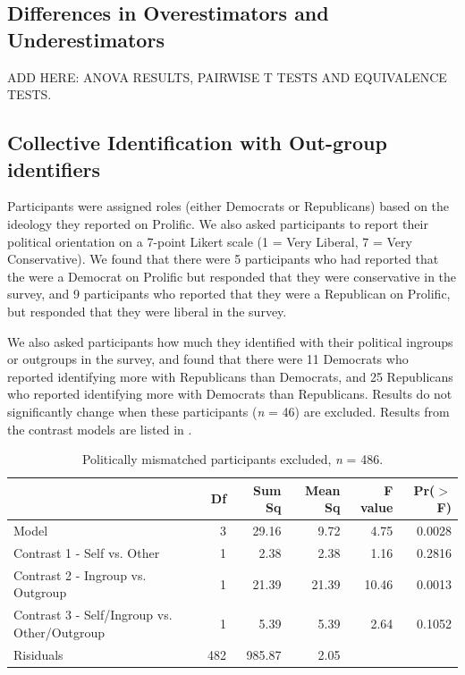 \documentclass[12pt,]{article}
\begin{document}
\clearpage
\subsection{Differences in Overestimators and Underestimators}
\label{appendix:over_under2}


ADD HERE: ANOVA RESULTS, PAIRWISE T TESTS AND EQUIVALENCE TESTS. 



\newpage
\subsection{Collective Identification with Out-group identifiers}
\label{appendix:mismatch}


Participants were assigned roles (either Democrats or Republicans) based on the ideology they reported on Prolific. We also asked participants to report their political orientation on a 7-point Likert scale (1 = Very Liberal, 7 = Very Conservative). We found that there were 5 participants who had reported that the were a Democrat on Prolific but responded that they were conservative in the survey, and 9 participants who reported that they were a Republican on Prolific, but responded that they were liberal in the survey. 

We also asked participants how much they identified with their political ingroups or outgroups in the survey, and found that there were 11 Democrats who reported identifying more with Republicans than Democrats, and 25 Republicans who reported identifying more with Democrats than Republicans. Results do not significantly change when these participants (\emph{n} = 46) are excluded.  Results from the contrast models are listed in . 


\vspace{0.6cm}

\begin{table}[ht]
\centering
\begin{tabular}{lrrrrr}
  \hline
 & Df & Sum Sq & Mean Sq & F value & Pr($>$F) \\ 
  \hline
Model & 3 & 29.16 & 9.72 & 4.75 & 0.0028 \\ 
  Contrast 1 - Self vs. Other & 1 & 2.38 & 2.38 & 1.16 & 0.2816 \\ 
  Contrast 2 - Ingroup vs. Outgroup & 1 & 21.39 & 21.39 & 10.46 & 0.0013 \\ 
  Contrast 3 - Self/Ingroup vs. Other/Outgroup & 1 & 5.39 & 5.39 & 2.64 & 0.1052 \\ 
  Risiduals & 482 & 985.87 & 2.05 &  &  \\ 
   \hline
\end{tabular}
\caption{Politically mismatched participants excluded, \emph{n} = 486.} 
\label{mismatch}
\end{table}
\end{document}
